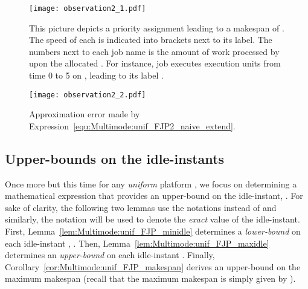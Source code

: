 \documentclass{article}
\newtheorem{validity test}{Validity Test}
\begin{document}
\begin{figure}[h]
\begin{center}
\texttt{[image: observation2\_1.pdf]}
\caption{This picture depicts a priority assignment leading to a makespan of . The speed of each  is indicated into brackets next to its label. The numbers next to each job name  is the amount of work processed by  upon the allocated . For instance, job  executes  execution units from time 0 to 5 on  , leading to its label .}
\label{fig:Multimode:unif_observation2_example1}
\end{center}
\end{figure}

\begin{figure}[h]
\begin{center}
\texttt{[image: observation2\_2.pdf]}
\caption{Approximation error made by Expression~\ref{equ:Multimode:unif_FJP2_naive_extend}.}
\label{fig:Multimode:unif_observation2_example2}
\end{center}
\end{figure}

\subsection{Upper-bounds  on the idle-instants}
\label{sec:Multimode:unif_FJP_upper_bounds}

Once more but this time for any \emph{uniform} platform , we focus on determining a mathematical expression that provides an upper-bound  on the  idle-instant, . For sake of clarity, the following two lemmas use the notations  instead of  and similarly, the notation  will be used to denote the \emph{exact} value of the  idle-instant. First, Lemma~\ref{lem:Multimode:unif_FJP_minidle} determines a \emph{lower-bound}  on each idle-instant , . Then, Lemma~\ref{lem:Multimode:unif_FJP_maxidle} determines an \emph{upper-bound}  on each idle-instant . Finally, Corollary~\ref{cor:Multimode:unif_FJP_makespan} derives an upper-bound on the maximum makespan (recall that the maximum makespan is simply given by ). 
\end{document}
